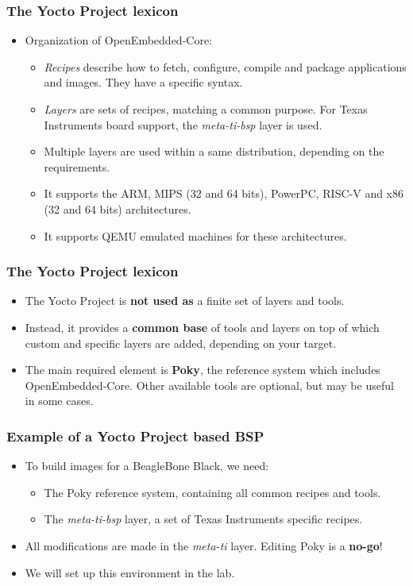 \begin{frame}
  \frametitle{The Yocto Project lexicon}
  \begin{itemize}
    \item Organization of OpenEmbedded-Core:
    \begin{itemize}
      \item {\em Recipes} describe how to fetch, configure, compile
        and package applications and images. They have a specific
        syntax.
      \item {\em Layers} are sets of recipes, matching a common
        purpose. For Texas Instruments board support, the {\em
        meta-ti-bsp} layer is used.
      \item Multiple layers are used within a same distribution,
        depending on the requirements.
      \item It supports the ARM, MIPS (32 and 64 bits), PowerPC,
        RISC-V and x86 (32 and 64 bits) architectures.
      \item It supports QEMU emulated machines for these architectures.
    \end{itemize}
  \end{itemize}
\end{frame}

\begin{frame}
  \frametitle{The Yocto Project lexicon}
  \begin{itemize}
    \item The Yocto Project is \textbf{not used as} a finite set of
          layers and tools.
    \item Instead, it provides a \textbf{common base} of tools and
          layers on top of which custom and specific layers are added,
          depending on your target.
    \item The main required element is \textbf{Poky}, the reference
          system which includes OpenEmbedded-Core. Other available
          tools are optional, but may be useful in some cases.
  \end{itemize}
\end{frame}

\begin{frame}
  \frametitle{Example of a Yocto Project based BSP}
  \begin{itemize}
    \item To build images for a BeagleBone Black, we need:
    \begin{itemize}
      \item The Poky reference system, containing all common recipes
            and tools.
      \item The {\em meta-ti-bsp} layer, a set of Texas Instruments
            specific recipes.
    \end{itemize}
    \item All modifications are made in the {\em meta-ti} layer.
      Editing Poky is a \textbf{no-go}!
    \item We will set up this environment in the lab.
  \end{itemize}
\end{frame}

